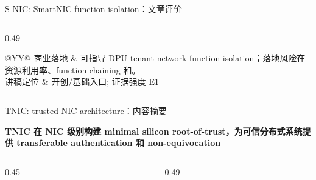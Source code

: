 \begin{frame}[t,shrink=6]{S-NIC: SmartNIC function isolation：文章评价}
\begin{columns}[T,totalwidth=\textwidth]
\begin{column}{0.49\textwidth}
{\begin{minipage}[t]{0.97\linewidth}
\begin{minipage}{0.92\linewidth}
{\begin{tabularx}{\linewidth}{@{}YY@{}}
商业落地 & 可指导 DPU tenant network-function isolation；落地风险在资源利用率、function chaining 和。 \\
讲稿定位 & 开创/基础入口; 证据强度 E1 \\
\bottomrule
\end{tabularx}
}
    \end{minipage}
    \vspace{1mm}
  \end{minipage}}
  \end{column}
\end{columns}
\end{frame}


\begin{frame}[t,shrink=6]{TNIC: trusted NIC architecture：内容摘要}
{\large\bfseries\color{Ink} TNIC 在 NIC 级别构建 minimal silicon root-of-trust，为可信分布式系统提供 transferable authentication 和 non-equivocation\par}\vspace{1.2mm}
\begin{columns}[T,totalwidth=\textwidth]
  \begin{column}{0.45\textwidth}
  \end{column}
  \begin{column}{0.49\textwidth}
\end{column}
\end{columns}
\end{frame}
